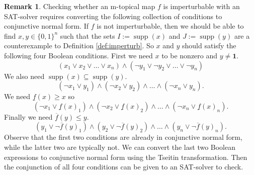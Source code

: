 \documentclass[10pt,reqno]{amsart}
\newcommand{\supp}{\operatorname{supp}}
\theoremstyle{plain}
\theoremstyle{definition}
\newtheorem{remark}[theorem]{Remark}
\numberwithin{equation}{section}
\begin{document}
\begin{remark}
Checking whether an m-topical map $f$ is imperturbable with an SAT-solver requires converting the following collection of conditions to conjunctive normal form.  If $f$ is not imperturbable, then we should be able to find $x, y\in \{0,1\}^n$ such that the sets $I := \supp(x)$ and $J := \supp(y)$ are a counterexample to Definition \ref{def:imperturb}. So $x$ and $y$ should satisfy the following four Boolean conditions. First we need $x$ to be nonzero and $y \neq \mathbf{1}$.
$$(x_1 \vee x_2 \vee \ldots \vee x_n) \wedge (\neg y_1 \vee \neg y_2 \vee \ldots \vee \neg y_n)$$
We also need $\supp(x) \subseteq \supp(y)$.  
$$(\neg x_1 \vee y_1) \wedge (\neg x_2 \vee y_2) \wedge \ldots \wedge (\neg x_n \vee y_n).$$
We need $\underline{f}(x) \ge x$ so 
$$(\neg x_1 \vee \underline{f}(x)_1) \wedge (\neg x_2 \vee \underline{f}(x)_2) \wedge \ldots \wedge (\neg x_n \vee \underline{f}(x)_n).$$
Finally we need $\overline{f}(y) \le y$.
$$(y_1 \vee \neg \overline{f}(y)_1) \wedge (y_2 \vee \neg \overline{f}(y)_2) \wedge \ldots \wedge (y_n \vee \neg \overline{f}(y)_n).$$
Observe that the first two conditions are already in conjunctive normal form, while the latter two are typically not. We can convert the last two Boolean expressions to conjunctive normal form using the Tseitin transformation.  Then the conjunction of all four conditions can be given to an SAT-solver to check.  
\end{remark}
\end{document}
